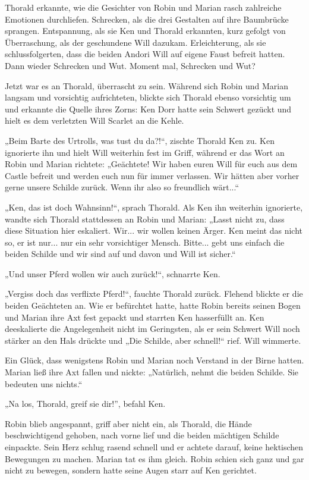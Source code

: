 Thorald erkannte, wie die Gesichter von Robin und Marian rasch zahlreiche Emotionen durchliefen. Schrecken, als die drei Gestalten auf ihre Baumbrücke sprangen. Entspannung, als sie Ken und Thorald erkannten, kurz gefolgt von Überraschung, als der geschundene Will dazukam. Erleichterung, als sie schlussfolgerten, dass die beiden Andori Will auf eigene Faust befreit hatten. Dann wieder Schrecken und Wut. Moment mal, Schrecken und Wut?

Jetzt war es an Thorald, überrascht zu sein. Während sich Robin und Marian langsam und vorsichtig aufrichteten, blickte sich Thorald ebenso vorsichtig um und erkannte die Quelle ihres Zorns: Ken Dorr hatte sein Schwert gezückt und hielt es dem verletzten Will Scarlet an die Kehle.

„Beim Barte des Urtrolls, was tust du da?!“, zischte Thorald Ken zu. Ken ignorierte ihn und hielt Will weiterhin fest im Griff, während er das Wort an Robin und Marian richtete: „Geächtete! Wir haben euren Will für euch aus dem Castle befreit und werden euch nun für immer verlassen. Wir hätten aber vorher gerne unsere Schilde zurück. Wenn ihr also so freundlich wärt...“

„Ken, das ist doch Wahnsinn!“, sprach Thorald. Als Ken ihn weiterhin ignorierte, wandte sich Thorald stattdessen an Robin und Marian: „Lasst nicht zu, dass diese Situation hier eskaliert. Wir... wir wollen keinen Ärger. Ken meint das nicht so, er ist nur... nur ein sehr vorsichtiger Mensch. Bitte... gebt uns einfach die beiden Schilde und wir sind auf und davon und Will ist sicher.“

„Und unser Pferd wollen wir auch zurück!“, schnarrte Ken.

„Vergiss doch das verflixte Pferd!“, fauchte Thorald zurück. Flehend blickte er die beiden Geächteten an. Wie er befürchtet hatte, hatte Robin bereits seinen Bogen und Marian ihre Axt fest gepackt und starrten Ken hasserfüllt an. Ken deeskalierte die Angelegenheit nicht im Geringsten, als er sein Schwert Will noch stärker an den Hals drückte und „Die Schilde, aber schnell!“ rief. Will wimmerte.

Ein Glück, dass wenigstens Robin und Marian noch Verstand in der Birne hatten. Marian ließ ihre Axt fallen und nickte: „Natürlich, nehmt die beiden Schilde. Sie bedeuten uns nichts.“

„Na los, Thorald, greif sie dir!”, befahl Ken.

Robin blieb angespannt, griff aber nicht ein, als Thorald, die Hände beschwichtigend gehoben, nach vorne lief und die beiden mächtigen Schilde einpackte. Sein Herz schlug rasend schnell und er achtete darauf, keine hektischen Bewegungen zu machen. Marian tat es ihm gleich. Robin schien sich ganz und gar nicht zu bewegen, sondern hatte seine Augen starr auf Ken gerichtet.

